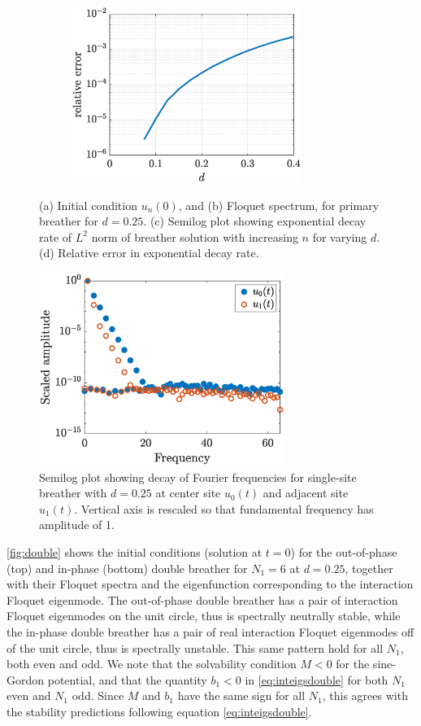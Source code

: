 \documentclass[12pt,reqno]{amsart}
\theoremstyle{definition}
\begin{document}
\begin{figure}
\begin{center}
\begin{subfigure}{0.45\linewidth}
		\caption{}
		\includegraphics[width=7.5cm]{singledecayerror.eps}
		\label{fig:singled}
	\end{subfigure}
	\end{center}
	\caption{(a) Initial condition $u_n(0)$, and (b) Floquet spectrum, for primary breather for $d = 0.25$. (c) Semilog plot showing exponential decay rate of $L^2$ norm of breather solution with increasing $n$ for varying $d$. (d) Relative error in exponential decay rate. }
	\label{fig:single}
\end{figure}

\begin{figure}
	\begin{center}
	\includegraphics[width=8cm]{freqdecay.eps} 
	\end{center}
	\caption{Semilog plot showing decay of Fourier frequencies for single-site breather with $d=0.25$ at center site $u_0(t)$ and adjacent site $u_1(t)$. Vertical axis is rescaled so that fundamental frequency has amplitude of 1.}
	\label{fig:freqdecay}
\end{figure}

\cref{fig:double} shows the initial conditions (solution at $t=0$) for the out-of-phase (top) and in-phase (bottom) double breather for $N_1 = 6$ at $d = 0.25$, together with their Floquet spectra and the eigenfunction corresponding to the interaction Floquet eigenmode. The out-of-phase double breather has a pair of interaction Floquet eigenmodes on the unit circle, thus is spectrally neutrally stable, while the in-phase double breather has a pair of real interaction Floquet eigenmodes off of the unit circle, thus is spectrally unstable. This same pattern hold for all $N_1$, both even and odd. We note that the solvability condition $M < 0$ for the sine-Gordon potential, and that the quantity $b_1 < 0$ in \cref{eq:inteigsdouble} for both $N_1$ even and $N_1$ odd. Since $M$ and $b_1$ have the same sign for all $N_1$, this agrees with the stability predictions following equation \cref{eq:inteigsdouble}.
\end{document}
